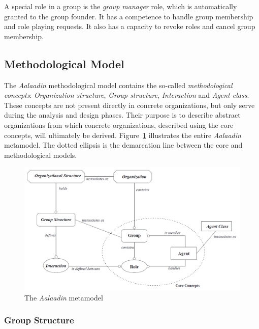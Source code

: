 A special role in a group is the \textit{group manager} role, which is automatically granted to the group founder.
It has a competence to handle group membership and role playing requests.
It also has a capacity to revoke roles and cancel group membership.

\subsection{Methodological Model}

The \textit{Aalaadin} methodological model contains the so-called \textit{methodological concepts}: \textit{Organization structure}, \textit{Group structure}, \textit{Interaction} and \textit{Agent class}.
These concepts are not present directly in concrete organizations, but only serve during the analysis and design phases.
Their purpose is to describe abstract organizations from which concrete organizations, described using the core concepts, will ultimately be derived.
Figure~\ref{figure:aalaadin-metamodel} illustrates the entire \textit{Aalaadin} metamodel. The dotted ellipsis is the demarcation line between the core and methodological models.

\begin{figure}[h]
	\centering
	\includegraphics[width=\textwidth]{images/aalaadin/aalaadin-metamodel.png}
	\caption{The \textit{Aalaadin} metamodel \cite{Ferber97}}
	\label{figure:aalaadin-metamodel}
\end{figure}

\subsubsection*{Group Structure}

